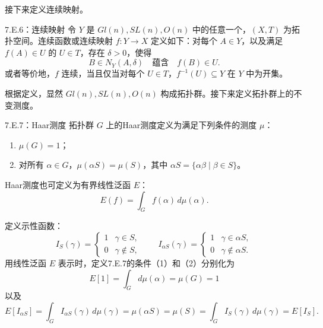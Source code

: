 接下来定义连续映射。

\begin{bookdefinition}{7.E.6：连续映射}
令 $Y$ 是 $Gl(n),SL(n),O(n)$ 中的任意一个，$(X,T)$ 为拓扑空间。连续函数或连续映射 $f:Y\to X$ 定义如下：对每个 $A\in Y$，以及满足 $f(A)\in U$ 的 $U\in T$，存在 $\delta>0$，使得
\[
B\in N_Y(A,\delta)\quad\text{蕴含}\quad f(B)\in U.
\]
或者等价地，$f$ 连续，当且仅当对每个 $U\in T$，$f^{-1}(U)\subseteq Y$ 在 $Y$ 中为开集。
\end{bookdefinition}

根据定义，显然 $Gl(n),SL(n),O(n)$ 构成拓扑群。接下来定义拓扑群上的不变测度。

\begin{bookdefinition}{7.E.7：Haar测度}
拓扑群 $G$ 上的Haar测度定义为满足下列条件的测度 $\mu$：
\begin{enumerate}
\item $\mu(G)=1$；
\item 对所有 $\alpha\in G$，$\mu(\alpha S)=\mu(S)$，其中 $\alpha S=\{\alpha\beta\mid\beta\in S\}$。
\end{enumerate}
Haar测度也可定义为有界线性泛函 $E$：
\begin{equation}
E(f)=\int_Gf(\alpha)\,d\mu(\alpha).\tag{7.E.4}
\end{equation}
\end{bookdefinition}

定义示性函数：
\[
I_S(\gamma)=\begin{cases}1&\gamma\in S,\\0&\gamma\notin S,\end{cases}
\qquad
I_{\alpha S}(\gamma)=\begin{cases}1&\gamma\in\alpha S,\\0&\gamma\notin\alpha S.\end{cases}
\]
用线性泛函 $E$ 表示时，定义7.E.7的条件（1）和（2）分别化为
\begin{equation}
E[1]=\int_Gd\mu(\alpha)=\mu(G)=1\tag{7.E.5}
\end{equation}
以及
\begin{equation}
E[I_{\alpha S}]=\int_GI_{\alpha S}(\gamma)\,d\mu(\gamma)
 =\mu(\alpha S)=\mu(S)=\int_GI_S(\gamma)\,d\mu(\gamma)=E[I_S].\tag{7.E.6}
\end{equation}

